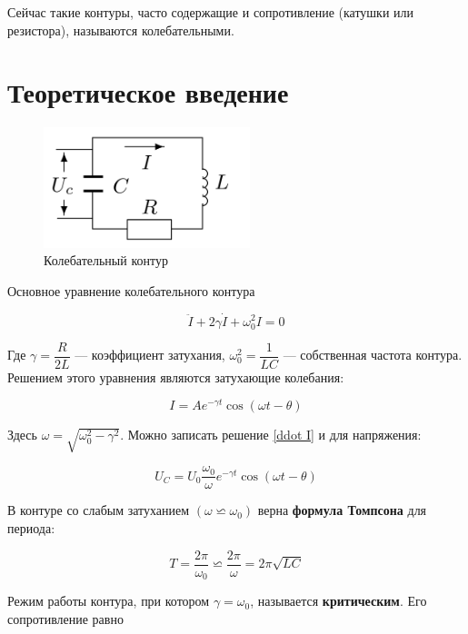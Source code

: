 \documentclass[12pt]{kiarticle}
\begin{document}
Сейчас такие контуры, часто содержащие и сопротивление (катушки или резистора), называются колебательными.

\section{Теоретическое введение}

\begin{figure} 
	\includegraphics[width=6cm]{RLC}
	\caption{Колебательный контур}
	\label{RLC}
\end{figure}

Основное уравнение колебательного контура 

\begin{equation}\label{ddot I}
\ddot{I} + 2\gamma\dot{I} + \omega_0^2I = 0
\end{equation}

Где $ \gamma = \dfrac{R}{2L} $ --- коэффициент затухания, $ \omega_0^2 = \dfrac{1}{LC} $ --- собственная частота контура. Решением этого уравнения являются затухающие колебания:

\begin{equation}\label{}
I = A e^{-\gamma t} \cos (\omega t - \theta)
\end{equation}

Здесь $ \omega = \sqrt{\omega_0^2 - \gamma^2} $. Можно записать решение \eqref{ddot I} и для напряжения:

\begin{equation}\label{}
U_C = U_0 \dfrac{\omega_0}{\omega} e^{-\gamma t}\cos (\omega t - \theta)
\end{equation}

В контуре со слабым затуханием $ (\omega \backsimeq \omega_0) $ верна \textbf{формула Томпсона} для периода: 

\begin{equation}\label{}
T = \dfrac{2\pi}{\omega_0} \backsimeq  \dfrac{2\pi}{\omega} = 2\pi\sqrt{LC}
\end{equation}

Режим работы контура, при котором $ \gamma = \omega_0 $, называется \textbf{критическим}. Его сопротивление равно 
\end{document}
